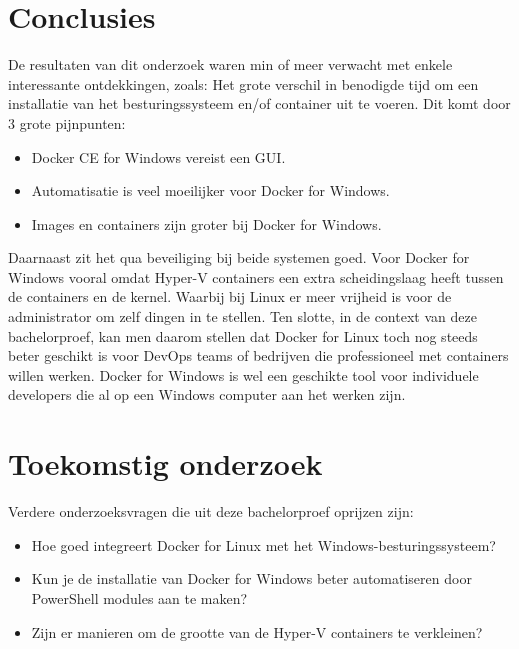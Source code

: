 \documentclass[a0,portrait]{a0poster}
\begin{document}
\begin{multicols}{2}



\color{HoGentAccent1} 
\section*{Conclusies}
\color{black}
De resultaten van dit onderzoek waren min of meer verwacht met enkele interessante ontdekkingen, zoals:
Het grote verschil in benodigde tijd om een installatie van het besturingssysteem en/of container uit te voeren. Dit komt door 3 grote pijnpunten:
\begin{itemize}
	\item Docker CE for Windows vereist een GUI.
	\item Automatisatie is veel moeilijker voor Docker for Windows.
	\item Images en containers zijn groter bij Docker for Windows.
\end{itemize}
Daarnaast zit het qua beveiliging bij beide systemen goed. Voor Docker for Windows vooral omdat Hyper-V containers een extra scheidingslaag heeft tussen de containers en de kernel. Waarbij bij Linux er meer vrijheid is voor de administrator om zelf dingen in te stellen.
Ten slotte, in de context van deze bachelorproef, kan men daarom stellen dat Docker for Linux toch nog steeds beter geschikt is voor DevOps teams of bedrijven die professioneel met containers willen werken. Docker for Windows is wel een geschikte tool voor individuele developers die al op een Windows computer aan het werken zijn.

\color{HoGentAccent1} 
\section*{Toekomstig onderzoek}
\color{black}

Verdere onderzoeksvragen die uit deze bachelorproef oprijzen zijn:
\begin{itemize}
	\item Hoe goed integreert Docker for Linux met het Windows-besturingssysteem?
	\item Kun je de installatie van Docker for Windows beter automatiseren door PowerShell modules aan te maken?
	\item Zijn er manieren om de grootte van de Hyper-V containers te verkleinen?
\end{itemize}


\end{multicols}
\end{document}
